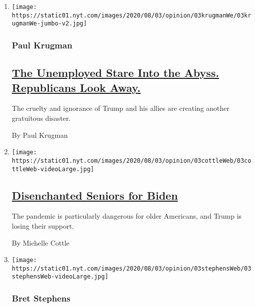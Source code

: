 \begin{enumerate}
\def\labelenumi{\arabic{enumi}.}
\item
  \texttt{[image: https://static01.nyt.com/images/2020/08/03/opinion/03krugmanWe/03krugmanWe-jumbo-v2.jpg]}

  \hypertarget{paul-krugman}{%
  \subsubsection{Paul Krugman}\label{paul-krugman}}

  \hypertarget{the-unemployed-stare-into-the-abyss-republicans-look-away}{%
  \subsection{\texorpdfstring{\href{/2020/08/03/opinion/republicans-unemployed-coronavirus.html}{The
  Unemployed Stare Into the Abyss. Republicans Look
  Away.}}{The Unemployed Stare Into the Abyss. Republicans Look Away.}}\label{the-unemployed-stare-into-the-abyss-republicans-look-away}}

  The cruelty and ignorance of Trump and his allies are creating another
  gratuitous disaster.

  By Paul Krugman
\item
  \texttt{[image: https://static01.nyt.com/images/2020/08/03/opinion/03cottleWeb/03cottleWeb-videoLarge.jpg]}

  \hypertarget{disenchanted-seniors-for-biden}{%
  \subsection{\texorpdfstring{\href{/2020/08/03/opinion/senior-voters-biden-trump-2020.html}{Disenchanted
  Seniors for
  Biden}}{Disenchanted Seniors for Biden}}\label{disenchanted-seniors-for-biden}}

  The pandemic is particularly dangerous for older Americans, and Trump
  is losing their support.

  By Michelle Cottle
\item
  \texttt{[image: https://static01.nyt.com/images/2020/08/03/opinion/03stephensWeb/03stephensWeb-videoLarge.jpg]}

  \hypertarget{bret-stephens}{%
  \subsubsection{Bret Stephens}\label{bret-stephens}}

  \hypertarget{the-siren-song-of-one-state}{%
}
\end{enumerate}
